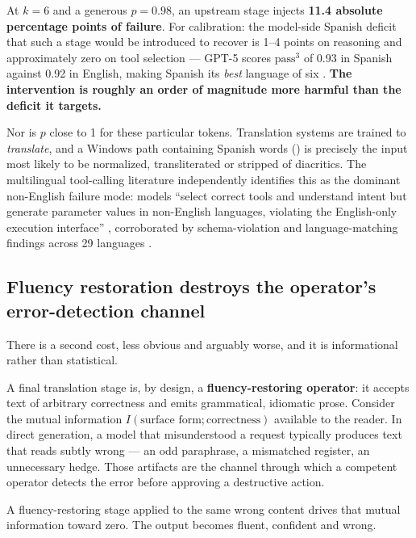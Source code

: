At $k=6$ and a generous $p = 0.98$, an upstream stage injects \textbf{11.4
absolute percentage points of failure}. For calibration: the model-side Spanish
deficit that such a stage would be introduced to recover is 1--4 points on
reasoning \citep{xuan2025mmluprox,thellmann2024european} and approximately zero
on tool selection --- GPT-5 scores $\text{pass}^{3}$ of 0.93 in Spanish against
0.92 in English, making Spanish its \emph{best} language of six
\citep{almeida2025ticketbench}. \textbf{The intervention is roughly an order of
magnitude more harmful than the deficit it targets.}

Nor is $p$ close to 1 for these particular tokens. Translation systems are
trained to \emph{translate}, and a Windows path containing Spanish words
()
is precisely the input most likely to be normalized, transliterated or stripped
of diacritics. The multilingual tool-calling literature independently identifies
this as the dominant non-English failure mode: models ``select correct tools and
understand intent but generate parameter values in non-English languages,
violating the English-only execution interface''
\citep{luo2026lostinexecution}, corroborated by schema-violation and
language-matching findings across 29 languages \citep{zhang2026itc}.

\subsection{Fluency restoration destroys the operator's error-detection channel}
\label{sec:fluency-restoration}

There is a second cost, less obvious and arguably worse, and it is informational
rather than statistical.

A final translation stage is, by design, a \textbf{fluency-restoring operator}:
it accepts text of arbitrary correctness and emits grammatical, idiomatic prose.
Consider the mutual information $I(\text{surface form}; \text{correctness})$
available to the reader. In direct generation, a model that misunderstood a
request typically produces text that reads subtly wrong --- an odd paraphrase, a
mismatched register, an unnecessary hedge. Those artifacts are the channel
through which a competent operator detects the error before approving a
destructive action.

A fluency-restoring stage applied to the same wrong content drives that mutual
information toward zero. The output becomes fluent, confident and wrong.

